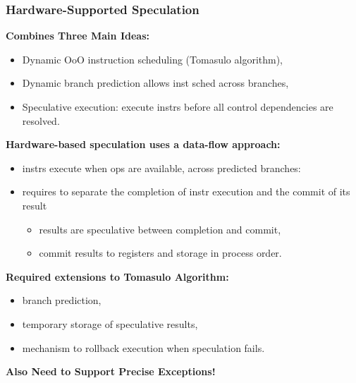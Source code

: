 \documentclass{beamer}
\newcommand{\emp}[1]{\textcolor{DikuRed}{ #1}}
\begin{document}
\begin{frame}[fragile,t]
\frametitle{Hardware-Supported Speculation}

\emp{\bf Combines Three Main Ideas:}
\begin{itemize}
    \item Dynamic OoO instruction scheduling (Tomasulo algorithm),
    \item Dynamic branch prediction allows inst sched across branches,
    \item Speculative execution: execute instrs before all control dependencies are resolved.
\end{itemize}\medskip

\emp{\bf Hardware-based speculation uses a data-flow approach:}
\begin{itemize}
    \item instrs execute when ops are available, across predicted branches:
    \item requires to separate the completion of instr execution and
            the commit of its result
        \begin{itemize}
            \item results are speculative between completion and commit,
            \item commit results to registers and storage in process order.
        \end{itemize}
\end{itemize}\medskip

\emp{\bf Required extensions to Tomasulo Algorithm:}
\begin{itemize}
    \item branch prediction,
    \item temporary storage of speculative results,
    \item mechanism to rollback execution when speculation fails.
\end{itemize}\medskip

\alert{\bf Also Need to Support Precise Exceptions!}
\end{frame}
\end{document}
